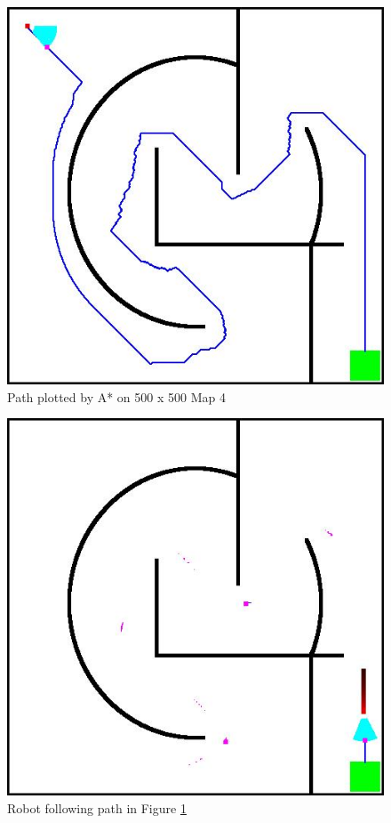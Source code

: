 \documentclass[11pt]{article}
\begin{document}
    \begin{figure}[ht]
        \centering
        \includegraphics[scale=0.2]{figures/map4_start_world_6.jpg}
        \caption{Path plotted by A* on 500 x 500 Map 4}
        \label{fig:map4_path}
    \end{figure}

    \begin{figure}[ht]
        \centering
        \includegraphics[scale=0.2]{figures/map4_end_world_504.jpg}
        \caption{Robot following path in Figure \ref{fig:map4_path} }
        \label{fig:map4_robot}
    \end{figure}
\end{document}
